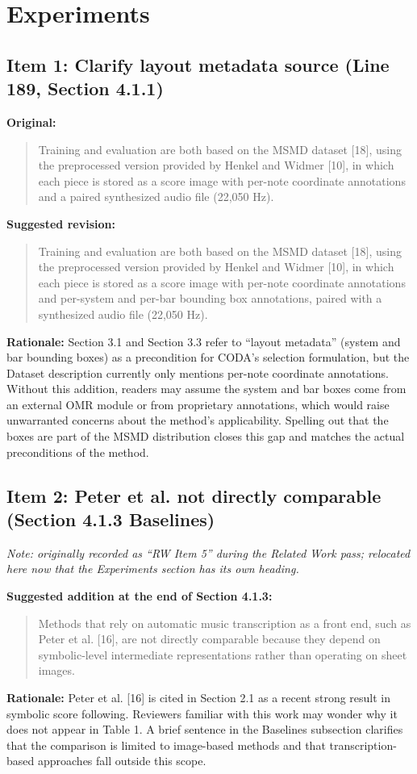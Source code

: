 \documentclass{article}
\begin{document}
\section*{Experiments}

\subsection*{Item 1: Clarify layout metadata source (Line 189, Section 4.1.1)}

\textbf{Original:}
\begin{quote}
Training and evaluation are both based on the MSMD dataset [18], using the preprocessed version provided by Henkel and Widmer [10], in which each piece is stored as a score image with per-note coordinate annotations and a paired synthesized audio file (22,050 Hz).
\end{quote}

\textbf{Suggested revision:}
\begin{quote}
Training and evaluation are both based on the MSMD dataset [18], using the preprocessed version provided by Henkel and Widmer [10], in which each piece is stored as a score image with per-note coordinate annotations and per-system and per-bar bounding box annotations, paired with a synthesized audio file (22,050 Hz).
\end{quote}

\textbf{Rationale:}
Section 3.1 and Section 3.3 refer to ``layout metadata'' (system and bar bounding boxes) as a precondition for CODA's selection formulation, but the Dataset description currently only mentions per-note coordinate annotations. Without this addition, readers may assume the system and bar boxes come from an external OMR module or from proprietary annotations, which would raise unwarranted concerns about the method's applicability. Spelling out that the boxes are part of the MSMD distribution closes this gap and matches the actual preconditions of the method.

\subsection*{Item 2: Peter et al. not directly comparable (Section 4.1.3 Baselines)}

\textit{Note: originally recorded as ``RW Item 5'' during the Related Work pass; relocated here now that the Experiments section has its own heading.}

\textbf{Suggested addition at the end of Section 4.1.3:}
\begin{quote}
Methods that rely on automatic music transcription as a front end, such as Peter et al. [16], are not directly comparable because they depend on symbolic-level intermediate representations rather than operating on sheet images.
\end{quote}

\textbf{Rationale:}
Peter et al. [16] is cited in Section 2.1 as a recent strong result in symbolic score following. Reviewers familiar with this work may wonder why it does not appear in Table 1. A brief sentence in the Baselines subsection clarifies that the comparison is limited to image-based methods and that transcription-based approaches fall outside this scope.
\end{document}
